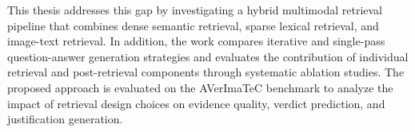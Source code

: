 This thesis addresses this gap by investigating a hybrid multimodal retrieval pipeline that combines dense semantic retrieval, sparse lexical retrieval, and image-text retrieval. In addition, the work compares iterative and single-pass question-answer generation strategies and evaluates the contribution of individual retrieval and post-retrieval components through systematic ablation studies. The proposed approach is evaluated on the AVerImaTeC benchmark to analyze the impact of retrieval design choices on evidence quality, verdict prediction, and justification generation.



































